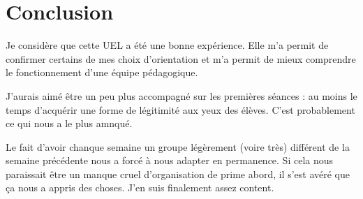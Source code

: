 \section{Conclusion}
Je considère que cette UEL a été une bonne expérience. Elle  m'a permit de confirmer certains de mes choix d'orientation
et m'a permit de mieux comprendre le fonctionnement d'une équipe pédagogique.

J'aurais aimé être un peu plus accompagné sur les premières séances : au moins le temps d'acquérir une forme de
légitimité aux yeux des élèves. C'est probablement ce qui nous a le plus amnqué.

Le fait d'avoir chanque semaine un groupe légèrement (voire très) différent de la semaine précédente nous a forcé à nous
adapter en permanence. Si cela nous paraissait être un manque cruel d'organisation de prime abord, il s'est avéré que
ça nous a appris des choses. J'en suis finalement assez content.


